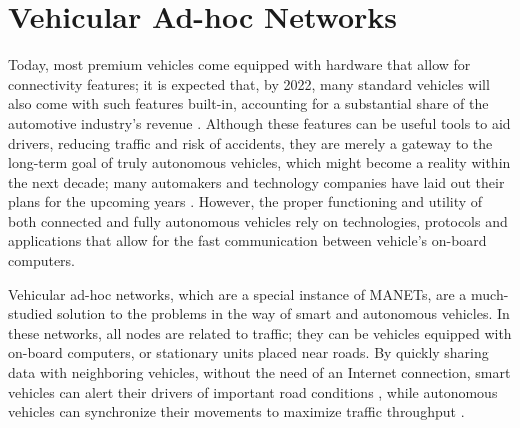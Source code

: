 \chapter{Vehicular Ad-hoc Networks}
\label{chap:vanets}

Today, most premium vehicles come equipped with hardware that allow for connectivity features; it is expected that, by 2022, many standard vehicles will also come with such features built-in, accounting for a substantial share of the automotive industry's revenue \citep{connectedcar2016}.
Although these features can be useful tools to aid drivers, reducing traffic and risk of accidents, they are merely a gateway to the long-term goal of truly autonomous vehicles, which might become a reality within the next decade; many automakers and technology companies have laid out their plans for the upcoming years \citep{tesla2016}.
However, the proper functioning and utility of both connected and fully autonomous vehicles rely on technologies, protocols and applications that allow for the fast communication between vehicle's on-board computers.

Vehicular ad-hoc networks, which are a special instance of MANETs, are a much-studied solution to the problems in the way of smart and autonomous vehicles.
In these networks, all nodes are related to traffic; they can be vehicles equipped with on-board computers, or stationary units placed near roads.
By quickly sharing data with neighboring vehicles, without the need of an Internet connection, smart vehicles can alert their drivers of important road conditions \citep{barba2012smart}, while autonomous vehicles can synchronize their movements to maximize traffic throughput \citep{amoozadeh2015platoon}.



